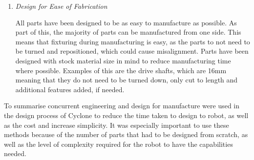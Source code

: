\begin{enumerate}
\item \textit{Design for Ease of Fabrication}
\par All parts have been designed to be as easy to manufacture as possible. As part of this, the majority of parts can be manufactured from one side. This means that fixturing during manufacturing is easy, as the parts to not need to be turned and repositioned, which could cause misalignment. Parts have been designed with stock material size in mind to reduce manufacturing time where possible. Examples of this are the drive shafts, which are 16mm meaning that they do not need to be turned down, only cut to length and additional features added, if needed.
\end{enumerate}
To summarise concurrent engineering and design for manufacture were used in the design process of Cyclone to reduce the time taken to design to robot, as well as the cost and increase simplicity. It was especially important to use these methods because of the number of parts that had to be designed from scratch, as well as the level of complexity required for the robot to have the capabilities needed. 